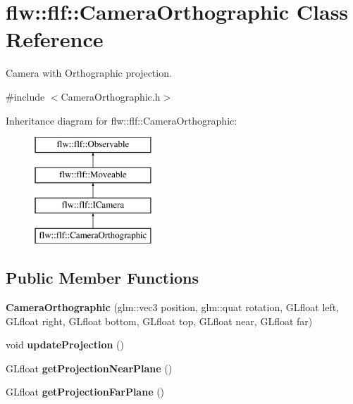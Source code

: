 \hypertarget{classflw_1_1flf_1_1CameraOrthographic}{}\section{flw\+:\+:flf\+:\+:Camera\+Orthographic Class Reference}
\label{classflw_1_1flf_1_1CameraOrthographic}


Camera with Orthographic projection.  




{\ttfamily \#include $<$Camera\+Orthographic.\+h$>$}

Inheritance diagram for flw\+:\+:flf\+:\+:Camera\+Orthographic\+:\begin{figure}[H]
\begin{center}
\leavevmode
\includegraphics[height=4.000000cm]{classflw_1_1flf_1_1CameraOrthographic}
\end{center}
\end{figure}
\subsection*{Public Member Functions}
\begin{DoxyCompactItemize}
\item 
\mbox{\label{classflw_1_1flf_1_1CameraOrthographic_af3256954755427e7d30080e4ddbc8bf2}} 
{\bfseries Camera\+Orthographic} (glm\+::vec3 position, glm\+::quat rotation, G\+Lfloat left, G\+Lfloat right, G\+Lfloat bottom, G\+Lfloat top, G\+Lfloat near, G\+Lfloat far)
\item 
\mbox{\label{classflw_1_1flf_1_1CameraOrthographic_a08256bc028355b465f23750e93718100}} 
void {\bfseries update\+Projection} ()
\item 
\mbox{\label{classflw_1_1flf_1_1CameraOrthographic_ab3af2aed92db2745649c2af0fab6c277}} 
G\+Lfloat {\bfseries get\+Projection\+Near\+Plane} ()
\item 
\mbox{\label{classflw_1_1flf_1_1CameraOrthographic_ac1dde1e4ba781656d215348806844837}} 
G\+Lfloat {\bfseries get\+Projection\+Far\+Plane} ()
\end{DoxyCompactItemize}
